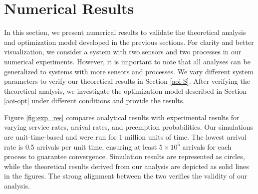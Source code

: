 
\section{Numerical Results}\label{numerical}

In this section, we present numerical results to validate the theoretical analysis and optimization model developed in the previous sections. For clarity and better visualization, we consider a system with two sensors and two processes in our numerical experiments. However, it is important to note that all analyses can be generalized to systems with more sensors and processes. We vary different system parameters to verify our theoretical results in Section \ref{aoi-S}. After verifying the theoretical analysis, we investigate the optimization model described in Section \ref{aoi-opt} under different conditions and provide the results.


Figure \ref{fig:exp_res} compares analytical results with experimental results for varying service rates, arrival rates, and preemption probabilities. Our simulations are unit-time-based and were run for 1 million units of time. The lowest arrival rate is 0.5 arrivals per unit time, ensuring at least $5 \times 10^5$ arrivals for each process to guarantee convergence. Simulation results are represented as circles, while the theoretical results derived from our analysis are depicted as solid lines in the figures. The strong alignment between the two verifies the validity of our analysis.


